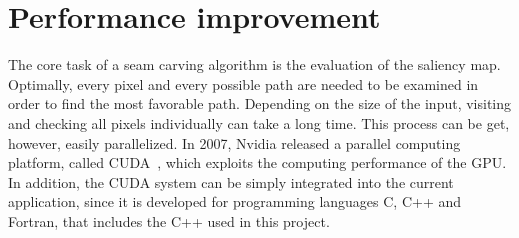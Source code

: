 \documentclass[draft,final]{vutinfth} %
\begin{document}
	\section{Performance improvement} 
	The core task of a seam carving algorithm is the evaluation of the saliency map.
	Optimally, every pixel and every possible path are needed to be examined in order to find the most favorable path.
	Depending on the size of the input, visiting and checking all pixels individually can take a long time.
	This process can be get, however, easily parallelized.
	In 2007, Nvidia released a parallel computing platform, called CUDA~\cite{Cook:2012:CPD:2430671}, which exploits the computing performance of the GPU.
	In addition, the CUDA system can be simply integrated into the current application, since it is developed for programming languages C, C++ and Fortran, that includes the C++ used in this project.   
	
\end{document}
